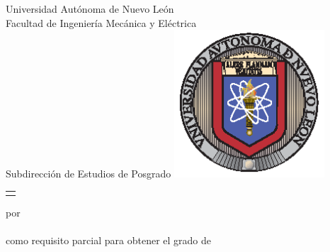 
\def\uanl{Universidad Autónoma de Nuevo León}
\def\fime{Facultad de Ingeniería Mecánica y Eléctrica}
\def\depg{Subdirección de Estudios de Posgrado}
\def\bety{Subdirector de Estudios de Posgrado}
\def\snnl{San Nicolás de los Garza, Nuevo León}

\thispagestyle{empty}

\begin{scshape}
\begin{center}
	{\Large \uanl} \\[5mm]
	{\large \fime} \\[5mm]
	{\large \depg}
	\vskip 15mm
	\includegraphics[height=55mm]{uanl}
	\vskip 12mm
	\begin{tabular}{p{11cm}}
		\centering
		{\large \titulo}
	\end{tabular}
	\vskip 7mm
	{por}\\[7mm]
	{\large \autor}\\[7mm]
	{como requisito parcial para obtener el grado de}\\[3mm]
	\MakeUppercase{\grado}\\
	\orientacion
	\vfill
	\fecha
\end{center}
\end{scshape}

\newpage
\thispagestyle{empty}

